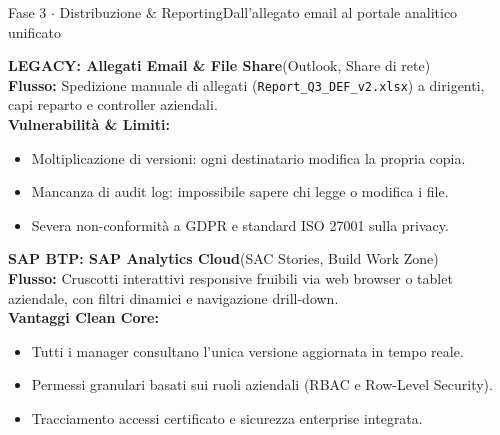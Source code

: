 \documentclass[a4paper,10pt]{extarticle}
\begin{document}
\vspace{-4pt}

\begin{wfphasebox}{Fase 3 $\cdot$ Distribuzione \& Reporting}{Dall'allegato email al portale analitico unificato}
  \begin{tcbraster}[raster columns=2, raster equal height, raster column skip=5pt]
    \begin{tcolorbox}[cardbase, colback=legacybg, colframe=legacyred, leftrule=2.5pt]
      \fontsize{7.3}{8.9}\selectfont
      \textbf{\color{legacydarkred}LEGACY: Allegati Email \& File Share}\hfill\color{textmuted}(Outlook, Share di rete)\\
      \textbf{Flusso:} Spedizione manuale di allegati (\texttt{Report\_Q3\_DEF\_v2.xlsx}) a dirigenti, capi reparto e controller aziendali.\\
      \textbf{\color{legacydarkred}Vulnerabilit\`a \& Limiti:}
      \begin{itemize}[leftmargin=8pt, itemsep=0pt, topsep=1pt]
        \item Moltiplicazione di versioni: ogni destinatario modifica la propria copia.
        \item Mancanza di audit log: impossibile sapere chi legge o modifica i file.
        \item Severa non-conformit\`a a GDPR e standard ISO 27001 sulla privacy.
      \end{itemize}
    \end{tcolorbox}
    \begin{tcolorbox}[cardbase, colback=modernbg, colframe=modernteal, leftrule=2.5pt]
      \fontsize{7.3}{8.9}\selectfont
      \textbf{\color{moderndarkteal}SAP BTP: SAP Analytics Cloud}\hfill\color{textmuted}(SAC Stories, Build Work Zone)\\
      \textbf{Flusso:} Cruscotti interattivi responsive fruibili via web browser o tablet aziendale, con filtri dinamici e navigazione drill-down.\\
      \textbf{\color{moderndarkteal}Vantaggi Clean Core:}
      \begin{itemize}[leftmargin=8pt, itemsep=0pt, topsep=1pt]
        \item Tutti i manager consultano l'unica versione aggiornata in tempo reale.
        \item Permessi granulari basati sui ruoli aziendali (RBAC e Row-Level Security).
        \item Tracciamento accessi certificato e sicurezza enterprise integrata.
      \end{itemize}
    \end{tcolorbox}
  \end{tcbraster}
\end{wfphasebox}
\end{document}
